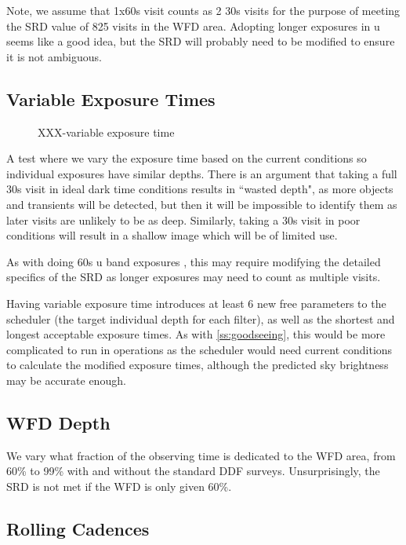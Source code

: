 Note, we assume that 1x60s visit counts as 2 30s visits for the purpose of meeting the SRD value of 825 visits in the WFD area. Adopting longer exposures in u seems like a good idea, but the SRD will probably need to be modified to ensure it is not ambiguous.

\subsection{Variable Exposure Times}


\begin{figure}
\caption{XXX-variable exposure time}\label{fig:varexptime}
\end{figure}

A test where we vary the exposure time based on the current conditions so individual exposures have similar depths. There is an argument that taking a full 30s visit in ideal dark time conditions results in ``wasted depth", as more objects and transients will be detected, but then it will be impossible to identify them as later visits are unlikely to be as deep. Similarly, taking a 30s visit in poor conditions will result in a shallow image which will be of limited use.

As with doing 60s u band exposures , this may require modifying the detailed specifics of the SRD as longer exposures may need to count as multiple visits.

Having variable exposure time introduces at least 6 new free parameters to the scheduler (the target individual depth for each filter), as well as the shortest and longest acceptable exposure times.  As with \ref{ss:goodseeing}, this would be more complicated to run in operations as the scheduler would need current conditions to calculate the modified exposure times, although the predicted sky brightness may be accurate enough.



\subsection{WFD Depth}

We vary what fraction of the observing time is dedicated to the WFD area, from 60\% to 99\% with and without the standard DDF surveys. Unsurprisingly, the SRD is not met if the WFD is only given 60\%.



\subsection{Rolling Cadences}

